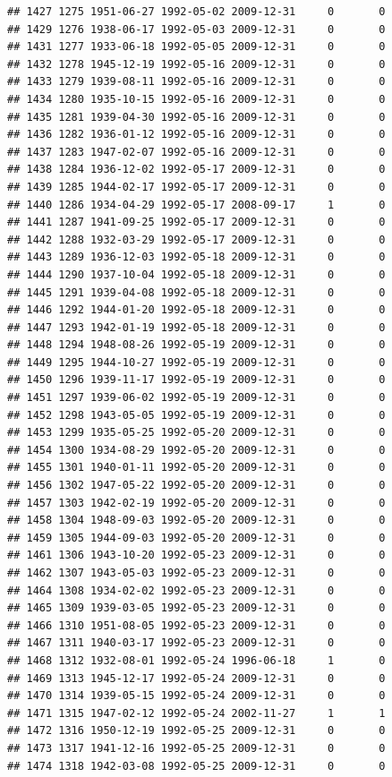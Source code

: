 \documentclass[
]{book}
\begin{document}
\begin{verbatim}
## 1427 1275 1951-06-27 1992-05-02 2009-12-31     0       0
## 1429 1276 1938-06-17 1992-05-03 2009-12-31     0       0
## 1431 1277 1933-06-18 1992-05-05 2009-12-31     0       0
## 1432 1278 1945-12-19 1992-05-16 2009-12-31     0       0
## 1433 1279 1939-08-11 1992-05-16 2009-12-31     0       0
## 1434 1280 1935-10-15 1992-05-16 2009-12-31     0       0
## 1435 1281 1939-04-30 1992-05-16 2009-12-31     0       0
## 1436 1282 1936-01-12 1992-05-16 2009-12-31     0       0
## 1437 1283 1947-02-07 1992-05-16 2009-12-31     0       0
## 1438 1284 1936-12-02 1992-05-17 2009-12-31     0       0
## 1439 1285 1944-02-17 1992-05-17 2009-12-31     0       0
## 1440 1286 1934-04-29 1992-05-17 2008-09-17     1       0
## 1441 1287 1941-09-25 1992-05-17 2009-12-31     0       0
## 1442 1288 1932-03-29 1992-05-17 2009-12-31     0       0
## 1443 1289 1936-12-03 1992-05-18 2009-12-31     0       0
## 1444 1290 1937-10-04 1992-05-18 2009-12-31     0       0
## 1445 1291 1939-04-08 1992-05-18 2009-12-31     0       0
## 1446 1292 1944-01-20 1992-05-18 2009-12-31     0       0
## 1447 1293 1942-01-19 1992-05-18 2009-12-31     0       0
## 1448 1294 1948-08-26 1992-05-19 2009-12-31     0       0
## 1449 1295 1944-10-27 1992-05-19 2009-12-31     0       0
## 1450 1296 1939-11-17 1992-05-19 2009-12-31     0       0
## 1451 1297 1939-06-02 1992-05-19 2009-12-31     0       0
## 1452 1298 1943-05-05 1992-05-19 2009-12-31     0       0
## 1453 1299 1935-05-25 1992-05-20 2009-12-31     0       0
## 1454 1300 1934-08-29 1992-05-20 2009-12-31     0       0
## 1455 1301 1940-01-11 1992-05-20 2009-12-31     0       0
## 1456 1302 1947-05-22 1992-05-20 2009-12-31     0       0
## 1457 1303 1942-02-19 1992-05-20 2009-12-31     0       0
## 1458 1304 1948-09-03 1992-05-20 2009-12-31     0       0
## 1459 1305 1944-09-03 1992-05-20 2009-12-31     0       0
## 1461 1306 1943-10-20 1992-05-23 2009-12-31     0       0
## 1462 1307 1943-05-03 1992-05-23 2009-12-31     0       0
## 1464 1308 1934-02-02 1992-05-23 2009-12-31     0       0
## 1465 1309 1939-03-05 1992-05-23 2009-12-31     0       0
## 1466 1310 1951-08-05 1992-05-23 2009-12-31     0       0
## 1467 1311 1940-03-17 1992-05-23 2009-12-31     0       0
## 1468 1312 1932-08-01 1992-05-24 1996-06-18     1       0
## 1469 1313 1945-12-17 1992-05-24 2009-12-31     0       0
## 1470 1314 1939-05-15 1992-05-24 2009-12-31     0       0
## 1471 1315 1947-02-12 1992-05-24 2002-11-27     1       1
## 1472 1316 1950-12-19 1992-05-25 2009-12-31     0       0
## 1473 1317 1941-12-16 1992-05-25 2009-12-31     0       0
## 1474 1318 1942-03-08 1992-05-25 2009-12-31     0       0

\end{verbatim}
\end{document}
